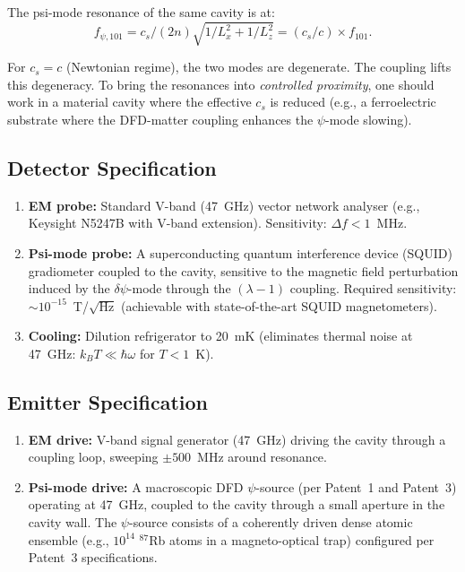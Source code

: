 \documentclass[aps,prd,twocolumn,superscriptaddress]{revtex4-2}
\begin{document}
The psi-mode resonance of the same cavity is at:
\begin{equation}
f_{\psi,101} = c_s/(2n)\sqrt{1/L_x^2 + 1/L_z^2} = (c_s/c)\times f_{101}.
\end{equation}

For $c_s = c$ (Newtonian regime), the two modes are degenerate.  The
coupling lifts this degeneracy.  To bring the resonances into
\textit{controlled proximity}, one should work in a material cavity
where the effective $c_s$ is reduced (e.g., a ferroelectric substrate
where the DFD-matter coupling enhances the $\psi$-mode slowing).

\subsection{Detector Specification}

\begin{enumerate}
  \item \textbf{EM probe:} Standard V-band (47~GHz) vector network analyser
    (e.g., Keysight N5247B with V-band extension). Sensitivity: $\Delta f < 1$~MHz.
  \item \textbf{Psi-mode probe:} A superconducting quantum interference device
    (SQUID) gradiometer coupled to the cavity, sensitive to the magnetic
    field perturbation induced by the $\delta\psi$-mode through the
    $(\lambda-1)$ coupling.  Required sensitivity: $\sim 10^{-15}$~T/$\sqrt{\text{Hz}}$
    (achievable with state-of-the-art SQUID magnetometers).
  \item \textbf{Cooling:} Dilution refrigerator to 20~mK (eliminates thermal
    noise at 47~GHz: $k_BT \ll \hbar\omega$ for $T < 1$~K).
\end{enumerate}

\subsection{Emitter Specification}

\begin{enumerate}
  \item \textbf{EM drive:} V-band signal generator (47~GHz) driving the
    cavity through a coupling loop, sweeping $\pm 500$~MHz around resonance.
  \item \textbf{Psi-mode drive:} A macroscopic DFD $\psi$-source (per Patent~1
    and Patent~3) operating at 47~GHz, coupled to the cavity through a
    small aperture in the cavity wall.  The $\psi$-source consists of a
    coherently driven dense atomic ensemble (e.g., $10^{14}$ $^{87}$Rb atoms
    in a magneto-optical trap) configured per Patent~3 specifications.
\end{enumerate}
\end{document}
